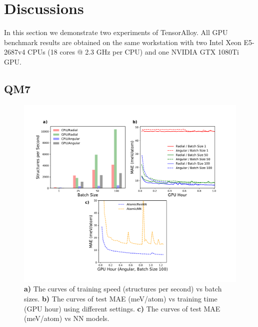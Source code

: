 \documentclass[preprint]{revtex4-2}
\begin{document}
% 
%
\section{Discussions}
\label{section:discussions}

In this section we demonstrate two experiments of TensorAlloy. All GPU benchmark
results are obtained on the same workstation with two Intel Xeon E5-2687v4 CPUs
(18 cores @ 2.3 GHz per CPU) and one NVIDIA GTX 1080Ti GPU.

% 
%
\subsection{QM7}

% 
%
\begin{figure}[h!]
\centering
\includegraphics[scale=0.54]{figures/qm7_speed.pdf}
\caption{\label{fig:benchmark_qm7} 
\textbf{a)} The curves of training speed (structures per second) vs batch sizes. 
\textbf{b)} The curves of test MAE (meV/atom) vs training time (GPU hour) using 
different settings.
\textbf{c)} The curves of test MAE (meV/atom) vs NN models. 
}
\end{figure}
\end{document}

